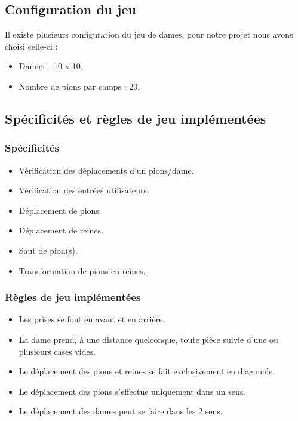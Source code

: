 \documentclass[10pt,a4paper]{report}
\begin{document}
	\subsection{Configuration du jeu}
	Il existe plusieurs configuration du jeu de dames, pour notre projet nous avons choisi celle-ci :
	\begin{itemize}[label = $\blacktriangleright$]
		\item Damier :  10 x 10.
		\item Nombre de pions par camps : 20.
	\end{itemize}
	
	\subsection{Spécificités et règles de jeu implémentées}
		\subsubsection{Spécificités}
		
		\begin{itemize}[label = $\blacktriangleright$]
		\item Vérification des déplacements d'un pions/dame.
		\item Vérification des entrées utilisateurs.
		\item Déplacement de pions.
		\item Déplacement de reines.
		\item Saut de pion(s).
		\item Transformation de pions en reines.
		\end{itemize}
		
		\subsubsection{Règles de jeu implémentées}
		
		\begin{itemize}[label = $\blacktriangleright$]
		\item Les prises se font en avant et en arrière.
		\item La dame prend, à une distance quelconque, toute pièce suivie d'une ou plusieurs cases vides.
		\item Le déplacement des pions et reines se fait exclusivement en diagonale.
		\item Le déplacement des pions s'effectue uniquement dans un sens.
		\item Le déplacement des dames peut se faire dans les 2 sens. 
		\end{itemize}
\end{document}
